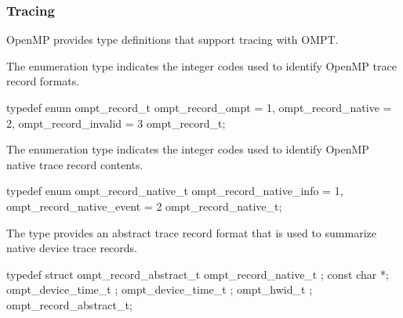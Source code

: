 \subsubsection{Tracing}
\label{sec:ompt-records}

OpenMP provides type definitions that support tracing with OMPT.


\summary
The  enumeration type indicates the integer codes 
used to identify OpenMP trace record formats.

\format
\begin{ccppspecific}
\begin{omptEnum}
typedef enum ompt_record_t {
  ompt_record_ompt               = 1,
  ompt_record_native             = 2,
  ompt_record_invalid            = 3
} ompt_record_t;
\end{omptEnum}
\end{ccppspecific}


\label{sec:ompt_record_native_t}

\summary
The  enumeration type indicates the integer codes 
used to identify OpenMP native trace record contents.

\format
\begin{ccppspecific}
\begin{omptEnum}
typedef enum ompt_record_native_t {
  ompt_record_native_info  = 1,
  ompt_record_native_event = 2
} ompt_record_native_t;
\end{omptEnum}
\end{ccppspecific}


\label{sec:ompt_record_abstract_t}

\summary
The  type provides an abstract trace record 
format that is used to summarize native device trace records.

\format
\begin{ccppspecific}
\begin{omptRecord}
typedef struct ompt_record_abstract_t {
  ompt_record_native_t ;
  const char *;
  ompt_device_time_t ;
  ompt_device_time_t ;
  ompt_hwid_t ;
} ompt_record_abstract_t;
\end{omptRecord}
\end{ccppspecific}

\descr

